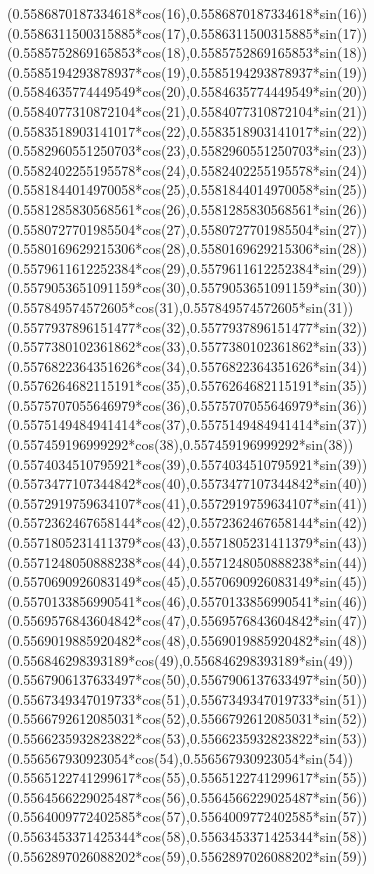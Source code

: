 {({0.5586870187334618*cos(16)},{0.5586870187334618*sin(16)})
({0.5586311500315885*cos(17)},{0.5586311500315885*sin(17)})
({0.5585752869165853*cos(18)},{0.5585752869165853*sin(18)})
({0.5585194293878937*cos(19)},{0.5585194293878937*sin(19)})
({0.5584635774449549*cos(20)},{0.5584635774449549*sin(20)})
({0.5584077310872104*cos(21)},{0.5584077310872104*sin(21)})
({0.5583518903141017*cos(22)},{0.5583518903141017*sin(22)})
({0.5582960551250703*cos(23)},{0.5582960551250703*sin(23)})
({0.5582402255195578*cos(24)},{0.5582402255195578*sin(24)})
({0.5581844014970058*cos(25)},{0.5581844014970058*sin(25)})
({0.5581285830568561*cos(26)},{0.5581285830568561*sin(26)})
({0.5580727701985504*cos(27)},{0.5580727701985504*sin(27)})
({0.5580169629215306*cos(28)},{0.5580169629215306*sin(28)})
({0.5579611612252384*cos(29)},{0.5579611612252384*sin(29)})
({0.5579053651091159*cos(30)},{0.5579053651091159*sin(30)})
({0.557849574572605*cos(31)},{0.557849574572605*sin(31)})
({0.5577937896151477*cos(32)},{0.5577937896151477*sin(32)})
({0.5577380102361862*cos(33)},{0.5577380102361862*sin(33)})
({0.5576822364351626*cos(34)},{0.5576822364351626*sin(34)})
({0.5576264682115191*cos(35)},{0.5576264682115191*sin(35)})
({0.5575707055646979*cos(36)},{0.5575707055646979*sin(36)})
({0.5575149484941414*cos(37)},{0.5575149484941414*sin(37)})
({0.557459196999292*cos(38)},{0.557459196999292*sin(38)})
({0.5574034510795921*cos(39)},{0.5574034510795921*sin(39)})
({0.5573477107344842*cos(40)},{0.5573477107344842*sin(40)})
({0.5572919759634107*cos(41)},{0.5572919759634107*sin(41)})
({0.5572362467658144*cos(42)},{0.5572362467658144*sin(42)})
({0.5571805231411379*cos(43)},{0.5571805231411379*sin(43)})
({0.5571248050888238*cos(44)},{0.5571248050888238*sin(44)})
({0.5570690926083149*cos(45)},{0.5570690926083149*sin(45)})
({0.5570133856990541*cos(46)},{0.5570133856990541*sin(46)})
({0.5569576843604842*cos(47)},{0.5569576843604842*sin(47)})
({0.5569019885920482*cos(48)},{0.5569019885920482*sin(48)})
({0.556846298393189*cos(49)},{0.556846298393189*sin(49)})
({0.5567906137633497*cos(50)},{0.5567906137633497*sin(50)})
({0.5567349347019733*cos(51)},{0.5567349347019733*sin(51)})
({0.5566792612085031*cos(52)},{0.5566792612085031*sin(52)})
({0.5566235932823822*cos(53)},{0.5566235932823822*sin(53)})
({0.556567930923054*cos(54)},{0.556567930923054*sin(54)})
({0.5565122741299617*cos(55)},{0.5565122741299617*sin(55)})
({0.5564566229025487*cos(56)},{0.5564566229025487*sin(56)})
({0.5564009772402585*cos(57)},{0.5564009772402585*sin(57)})
({0.5563453371425344*cos(58)},{0.5563453371425344*sin(58)})
({0.5562897026088202*cos(59)},{0.5562897026088202*sin(59)})
}

